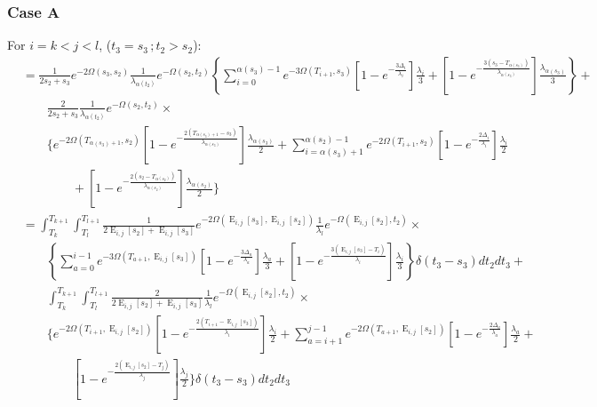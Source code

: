 \documentclass{article}
\DeclareMathOperator{\E}{E}
\begin{document}
\subsubsection{Case A}
For $i=k< j<l$, ($t_3=s_3\,;t_2>s_2$):
\begin{align*}
    &=\frac{1}{2s_2+s_3}e^{-2\Omega(s_3,s_2)}\frac{1}{\lambda_{\alpha(t_2)}}e^{-\Omega(s_2,t_2)}
    \left\{\sum_{i=0}^{\alpha(s_3)-1}e^{-3\Omega(T_{i+1},s_3)}
        \left[1-e^{-\frac{3\Delta_i}{\lambda_i}}\right]\frac{\lambda_i}{3}+
    \left[1-e^{-\frac{3\left(s_3-T_{\alpha(s_3)}\right)}{\lambda_{\alpha(s_3)}}}\right]
        \frac{\lambda_{\alpha(s_3)}}{3}\right\}+\\
    &\qquad\frac{2}{2s_2+s_3}\frac{1}{\lambda_{\alpha(t_2)}}e^{-\Omega(s_2,t_2)}\times\\
    &\qquad\Bigg\{e^{-2\Omega(T_{\alpha(s_3)+1},s_2)}\left[1-e^{-\frac{2\left(T_{\alpha(s_3)+1}-s_3\right)}{\lambda_{\alpha(s_3)}}}\right]\frac{\lambda_{\alpha(s_3)}}{2}+\sum_{i=\alpha(s_3)+1}^{\alpha(s_2)-1}e^{-2\Omega\left(T_{i+1},s_2\right)}\left[1-e^{-\frac{2\Delta_i}{\lambda_i}}\right]\frac{\lambda_i}{2}\\
    &\qquad\qquad+\left[1-e^{-\frac{2\left(s_2-T_{\alpha(s_2)}\right)}{\lambda_{\alpha(s_2)}}}\right]\frac{\lambda_{\alpha(s_2)}}{2}
    \Bigg\}
    \\
    &=\int_{T_k}^{T_{k+1}}\int_{T_l}^{T_{l+1}}\frac{1}{2\E_{i,j}[s_2]+\E_{i,j}[s_3]}e^{-2\Omega(\E_{i,j}[s_3],\E_{i,j}[s_2])}\frac{1}{\lambda_l}e^{-\Omega(\E_{i,j}[s_2],t_2)}\times\\
    &\qquad\left\{\sum_{a=0}^{i-1}e^{-3\Omega(T_{a+1},\E_{i,j}[s_3])}
        \left[1-e^{-\frac{3\Delta_a}{\lambda_a}}\right]\frac{\lambda_a}{3}+
    \left[1-e^{-\frac{3\left(\E_{i,j}[s_3]-T_i\right)}{\lambda_i}}\right]
    \frac{\lambda_i}{3}\right\}\delta(t_3-s_3)dt_2dt_3+\\
    &\qquad\int_{T_k}^{T_{k+1}}\int_{T_l}^{T_{l+1}}
        \frac{2}{2\E_{i,j}[s_2]+\E_{i,j}[s_3]}\frac{1}{\lambda_l}e^{-\Omega(\E_{i,j}[s_2],t_2)}\times\\
    &\qquad\Bigg\{e^{-2\Omega(T_{i+1},\E_{i,j}[s_2])}\left[1-e^{-\frac{2\left(T_{i+1}-\E_{i,j}[s_3]\right)}{\lambda_i}}\right]\frac{\lambda_i}{2}+\sum_{a=i+1}^{j-1}e^{-2\Omega\left(T_{a+1},\E_{i,j}[s_2]\right)}\left[1-e^{-\frac{2\Delta_a}{\lambda_a}}\right]\frac{\lambda_a}{2}+\\
    &\qquad\qquad\left[1-e^{-\frac{2\left(\E_{i,j}[s_2]-T_j\right)}{\lambda_j}}\right]\frac{\lambda_j}{2}
    \Bigg\}\delta(t_3-s_3)dt_2dt_3\\

\end{align*}
\end{document}
